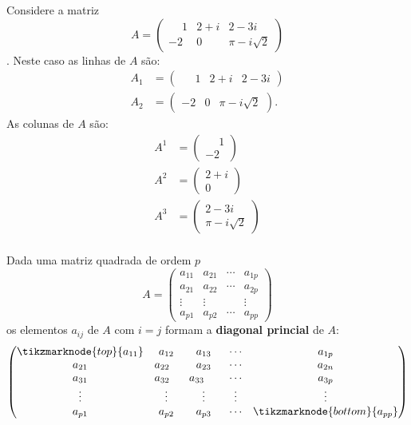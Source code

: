 \begin{exemplo}
	Considere a matriz
	\[
		A = \begin{pmatrix}
			\phantom{-} 1 & 2 + i & 2 - 3i\\
			-2 & 0 & \pi - i\sqrt{2}
		\end{pmatrix}
	\].
	Neste caso as linhas de $A$ são:
	\begin{align*}
		A_1 &= \begin{pmatrix}\phantom{-} 1 & 2 + i & 2 - 3i\end{pmatrix}\\
		A_2 &= \begin{pmatrix}-2 & 0 & \pi - i\sqrt{2}\end{pmatrix}.
	\end{align*}
	As colunas de $A$ são:
	\begin{align*}
		A^1 &= \begin{pmatrix}
			\phantom{-} 1\\-2
			\end{pmatrix}\\
		A^2 &= \begin{pmatrix}
			2 + i\\0
			\end{pmatrix}\\
		A^3 &= \begin{pmatrix}
			2 - 3i\\\pi - i\sqrt{2}
			\end{pmatrix}\\
	\end{align*}
\end{exemplo}

Dada uma matriz quadrada de ordem $p$
\[
	A = \begin{pmatrix}
		a_{11} & a_{21} & \cdots & a_{1p}\\
		a_{21} & a_{22} & \cdots & a_{2p}\\
		\vdots & \vdots & & \vdots\\
		a_{p1} & a_{p2} & \cdots & a_{pp}
	\end{pmatrix}
\]
os elementos $a_{ij}$ de $A$ com $i = j$ formam a \textbf{diagonal princial} de $A$:
\[
	\begin{pmatrix}
		\tikzmarknode{top}{a_{11}} & a_{12} & a_{13} & \cdots  & a_{1p}\\
		a_{21} & a_{22} \phantom{-} & a_{23} & \cdots  & a_{2n}\\
		a_{31} & a_{32}\phantom{-} & a_{33} \phantom{-1} & \cdots  & a_{3p}\\
		\vdots  & \vdots   & \vdots  & \vdots  & \vdots\\
		a_{p1} & a_{p2} & a_{p3} & \cdots  & \tikzmarknode{bottom}{a_{pp}}\\
	\end{pmatrix}
\]

